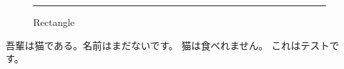 \documentclass[uplatex,dvipdfmx]{jlreq}
\begin{document}
\lipsum[1-2]
  \begin{figure}[h]
    \centering
    \rule{8cm}{6cm}
    \caption{Rectangle}
  \end{figure}
吾輩は猫である。名前はまだないです。
猫は食べれません。
これはテストです。
\end{document}

